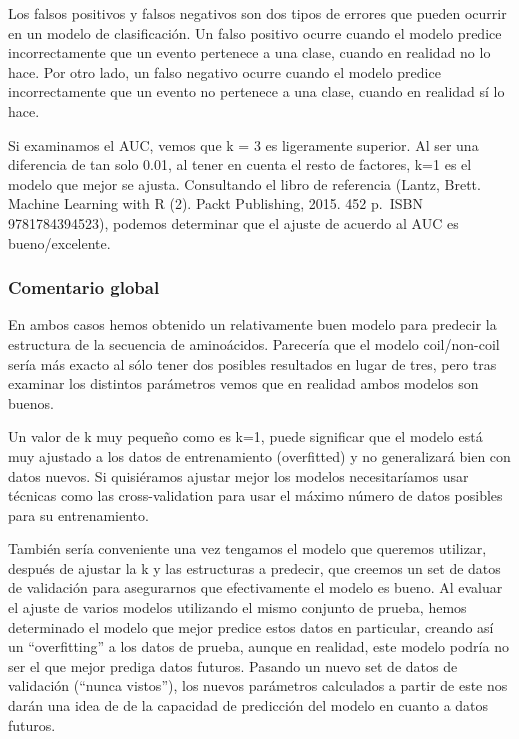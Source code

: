 \documentclass[
]{article}
\begin{document}
Los falsos positivos y falsos negativos son dos tipos de errores que
pueden ocurrir en un modelo de clasificación. Un falso positivo ocurre
cuando el modelo predice incorrectamente que un evento pertenece a una
clase, cuando en realidad no lo hace. Por otro lado, un falso negativo
ocurre cuando el modelo predice incorrectamente que un evento no
pertenece a una clase, cuando en realidad sí lo hace.

Si examinamos el AUC, vemos que k = 3 es ligeramente superior. Al ser
una diferencia de tan solo 0.01, al tener en cuenta el resto de
factores, k=1 es el modelo que mejor se ajusta. Consultando el libro de
referencia (Lantz, Brett. Machine Learning with R (2). Packt Publishing,
2015. 452 p.~ISBN 9781784394523), podemos determinar que el ajuste de
acuerdo al AUC es bueno/excelente.

\hypertarget{comentario-global}{%
\subsubsection{Comentario global}\label{comentario-global}}

En ambos casos hemos obtenido un relativamente buen modelo para predecir
la estructura de la secuencia de aminoácidos. Parecería que el modelo
coil/non-coil sería más exacto al sólo tener dos posibles resultados en
lugar de tres, pero tras examinar los distintos parámetros vemos que en
realidad ambos modelos son buenos.

Un valor de k muy pequeño como es k=1, puede significar que el modelo
está muy ajustado a los datos de entrenamiento (overfitted) y no
generalizará bien con datos nuevos. Si quisiéramos ajustar mejor los
modelos necesitaríamos usar técnicas como las cross-validation para usar
el máximo número de datos posibles para su entrenamiento.

También sería conveniente una vez tengamos el modelo que queremos
utilizar, después de ajustar la k y las estructuras a predecir, que
creemos un set de datos de validación para asegurarnos que efectivamente
el modelo es bueno. Al evaluar el ajuste de varios modelos utilizando el
mismo conjunto de prueba, hemos determinado el modelo que mejor predice
estos datos en particular, creando así un ``overfitting'' a los datos de
prueba, aunque en realidad, este modelo podría no ser el que mejor
prediga datos futuros. Pasando un nuevo set de datos de validación
(``nunca vistos''), los nuevos parámetros calculados a partir de este
nos darán una idea de de la capacidad de predicción del modelo en cuanto
a datos futuros.
\end{document}
